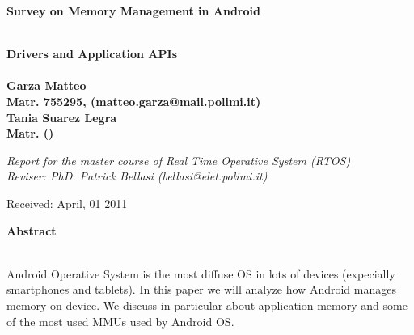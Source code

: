 \documentclass[a4paper,10pt]{article}
\newenvironment*{mytitle}{\begin{LARGE}\bf}{\end{LARGE}\\}%
\newenvironment*{mysubtitle}{\bf}{\\[1.5ex]}%
\newenvironment*{myabstract}{\begin{Large}\bf}{\end{Large}\\[2.5ex]}%
\begin{document}
\begin{mytitle}Survey on Memory Management in Android\end{mytitle}
\begin{mysubtitle}Drivers and Application APIs\end{mysubtitle}
%
%
\\
Garza Matteo\\
Matr. 755295, (matteo.garza@mail.polimi.it)\\
Tania Suarez Legra\\
Matr. ()\\
\hspace{10ex}
\begin{flushright}
\emph{Report for the master course of Real Time Operative System (RTOS)}\\
\emph{Reviser: PhD. Patrick Bellasi (bellasi@elet.polimi.it)}
\end{flushright}

Received: April, 01 2011\\
\hspace{10ex}

\begin{myabstract} Abstract \end{myabstract}
Android Operative System is the most diffuse OS in lots of devices (expecially smartphones and tablets).
In this paper we will analyze how Android manages memory on device. We discuss in particular about application memory and
some of the most used MMUs used by Android OS.
\end{document}
